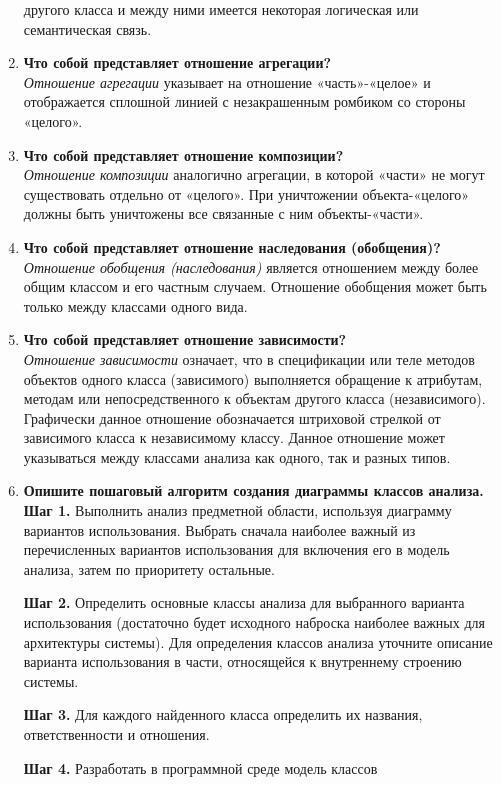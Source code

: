 \begin{enumerate}
		другого класса и между ними имеется некоторая логическая
		или семантическая связь.
	\item \textbf{Что собой представляет отношение агрегации?}\\
		\textit{Отношение агрегации} указывает на отношение «часть»-«целое»
		и отображается сплошной линией с незакрашенным ромбиком
		со стороны «целого».
	\item \textbf{Что собой представляет отношение композиции?}\\
		\textit{Отношение композиции} аналогично агрегации, в которой «части»
		не могут существовать отдельно от «целого». При уничтожении
		объекта-«целого» должны быть уничтожены все связанные с ним
		объекты-«части».
	\item \textbf{Что собой представляет отношение наследования (обобщения)?}\\
		\textit{Отношение обобщения (наследования)} является отношением между
		более общим классом и его частным случаем. Отношение обобщения
		может быть только между классами одного вида.
	\item \textbf{Что собой представляет отношение зависимости?}\\
		\textit{Отношение зависимости} означает, что в спецификации
		или теле методов объектов одного класса (зависимого) выполняется
		обращение к атрибутам, методам или непосредственного к объектам
		другого класса (независимого). Графически данное отношение
		обозначается штриховой стрелкой от зависимого класса к независимому
		классу. Данное отношение может указываться между классами анализа
		как одного, так и разных типов.
	\item \textbf{Опишите пошаговый алгоритм создания диаграммы
		классов анализа.}\\
		\textbf{Шаг 1.} Выполнить анализ предметной области,
		используя диаграмму вариантов использования. Выбрать сначала
		наиболее важный из перечисленных вариантов использования для включения
		его в модель анализа, затем по приоритету остальные.\par
		\textbf{Шаг 2.} Определить основные классы анализа для выбранного
		варианта использования (достаточно будет исходного наброска наиболее
		важных для архитектуры системы). Для определения классов анализа
		уточните описание варианта использования в части, относящейся
		к внутреннему строению системы.\par
		\textbf{Шаг 3.} Для каждого найденного класса определить их названия,
		ответственности и отношения.\par
		\textbf{Шаг 4.} Разработать в программной среде модель классов

\end{enumerate}
